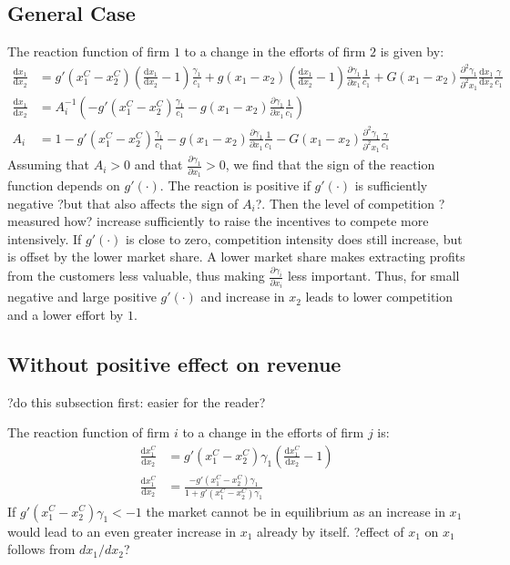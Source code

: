 \documentclass[a4paper, 11pt]{article}
\renewcommand{\d}{\text{d}}
\begin{document}
\subsection{General Case}
The reaction function of firm $1$ to a change in the efforts of firm $2$ is given by:
\begin{align}
\frac{\d x_1}{\d x_2} &= g'(x_1^C-x_2^C)\left(\frac{\d x_1}{\d x_2}-1\right)\frac{\gamma_1}{c_1} + g(x_1-x_2)\left(\frac{\d x_1}{\d x_2}-1\right)\frac{\partial \gamma_1}{\partial x_1}\frac{1}{c_1} + G(x_1-x_2)\frac{\partial^2 \gamma_1}{\partial^2 x_1}\frac{\d x_1}{\d x_2}\frac{\gamma}{c_1}\\
\frac{\d x_1}{\d x_2} &= A_i^{-1} \left(-g'(x_1^C-x_2^C)\frac{\gamma_1}{c_1} - g(x_1-x_2)\frac{\partial \gamma_1}{\partial x_1}\frac{1}{c_1}\right)\\
A_i &= 1 - g'(x_1^C-x_2^C)\frac{\gamma_1}{c_1}-g(x_1-x_2)\frac{\partial \gamma_1}{\partial x_1}\frac{1}{c_1}-G(x_1-x_2)\frac{\partial^2 \gamma_1}{\partial^2 x_1}\frac{\gamma}{c_1}
\end{align}
Assuming that $A_i>0$ and that $\frac{\partial \gamma_1}{\partial x_1}>0$, we find that the sign of the reaction function depends on $g'(\cdot)$. The reaction is positive if $g'(\cdot)$ is sufficiently negative ?but that also affects the sign of $A_i$?. Then the level of competition ?measured how? increase sufficiently to raise the incentives to compete more intensively. If $g'(\cdot)$ is close to zero, competition intensity does still increase, but is offset by the lower market share. A lower market share makes extracting profits from the customers less valuable, thus making $\frac{\partial \gamma_i}{\partial x_i}$ less important. Thus, for small negative and large positive $g'(\cdot)$ and increase in $x_2$ leads to lower competition and a lower effort by $1$. 

\subsection{Without positive effect on revenue}
?do this subsection first: easier for the reader?

The reaction function of firm $i$ to a change in the efforts of firm $j$ is:
\begin{align}
\frac{\d x_1^C}{\d x_2} &= g'(x_1^C-x_2^C)\gamma_1\left(\frac{\d x_1^C}{\d x_2}-1\right)\\
\frac{\d x_1^C}{\d x_2} &= \frac{-g'(x_1^C-x_2^C)\gamma_1}{1+g'(x_1^C-x_2^C)\gamma_1}
\end{align}
If $g'(x_1^C-x_2^C)\gamma_1<-1$ the market cannot be in equilibrium as an increase in $x_1$ would lead to an even greater increase in $x_1$ already by itself. ?effect of $x_1$ on $x_1$ follows from $dx_1/dx_2$?
\end{document}
